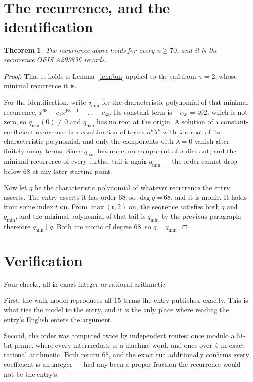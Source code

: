 \documentclass[11pt,a4paper]{article}
\theoremstyle{plain}
\newtheorem{theorem}{Theorem}
\theoremstyle{definition}
\begin{document}
\section{The recurrence, and the identification}

\begin{theorem}
The recurrence above holds for every $n\ge70$, and it is the recurrence OEIS A299836 records.
\end{theorem}

\begin{proof}
That it holds is Lemma~\ref{lem:bm} applied to the tail from $n=2$, whose minimal
recurrence it is.

For the identification, write $q_{\min}$ for the characteristic polynomial of that minimal
recurrence, $x^{68}-c_1x^{68-1}-\dots-c_{68}$. Its constant term is
$-c_{68}=402$, which is not zero, so $q_{\min}(0)\neq0$ and $q_{\min}$ has no
root at the origin. A solution of a constant-coefficient recurrence is a combination of terms
$n^{k}\lambda^{n}$ with $\lambda$ a root of its characteristic polynomial, and only the
components with $\lambda=0$ vanish after finitely many terms. Since $q_{\min}$ has none, no
component of $a$ dies out, and the minimal recurrence of every further tail is again
$q_{\min}$ --- the order cannot drop below $68$ at any later starting point.

Now let $q$ be the characteristic polynomial of whatever recurrence the entry asserts. The
entry asserts it has order $68$, so $\deg q=68$, and it is monic. It holds from some
index $t$ on. From $\max(t,2)$ on, the sequence satisfies both $q$ and $q_{\min}$, and
the minimal polynomial of that tail is $q_{\min}$ by the previous paragraph; therefore
$q_{\min}\mid q$. Both are monic of degree $68$, so $q=q_{\min}$.
\end{proof}

\section{Verification}

Four checks, all in exact integer or rational arithmetic.

First, the walk model reproduces all $15$ terms the entry publishes, exactly. This is
what ties the model to the entry, and it is the only place where reading the entry's English
enters the argument.

Second, the order was computed twice by independent routes: once modulo a $61$-bit prime, where
every intermediate is a machine word, and once over $\mathbb{Q}$ in exact rational arithmetic.
Both return $68$, and the exact run additionally confirms every coefficient is an integer
--- had any been a proper fraction the recurrence would not be the entry's.
\end{document}
